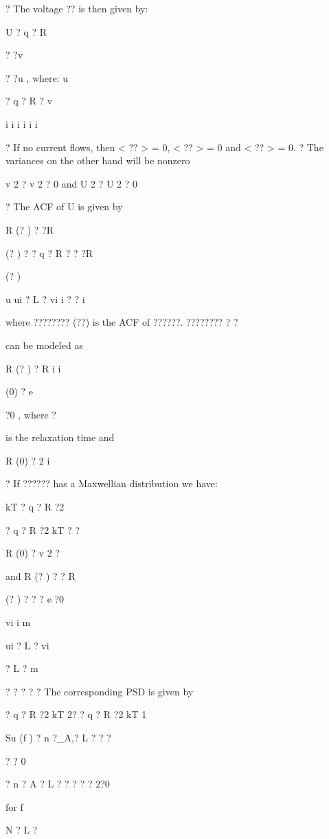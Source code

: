 \documentclass[2pt,landscape]{article}
\begin{document}
\begin{multicols*}{5}
?	The voltage ?? is then given by:


U ? q ? R


? ?v


? ?u ,	where: u


? q ? R ? v


i		i	i	i 
i	i

?	If no current flows, then < ?? > = 0, < ?? > = 0 and < ?? > = 0.
?	The variances on the other hand will be nonzero


v 2 ? v 2	? 0 and U 2 ? U 2	? 0



?	The ACF of U is given by


R (? ) ? ?R


(? ) ? ? q ? R ? ? ?R


(? )


u	ui	?	L	?	vi
i	?	?	i


where ???????? (??) is the ACF of ??????. ????????
? ?


can be modeled as


R (? ) ? R
i	i


(0)	? e


?0 ,	where ?


is the relaxation 
time and


R (0) ?	2
i


?	If ?????? has a Maxwellian distribution we have:


kT	? q ? R ?2


? q ? R ?2	kT	? ?


R (0) ? v 2	?


and R (? ) ?	? 
R




(? ) ?	?	? e ?0



vi	i	m


ui	?	L	?	vi


?	L	?	m


?	?	?	?
?	The corresponding PSD is given by

? q ? R ?2	kT	2?	? q ? R ?2	kT	1


Su (f ) ? n ?\_A,? L ? ?	?


?	?	0	





? n ? A ? L ? ?	? ?	? 2?0




for f \textbullet 




N	?	L	?



\end{multicols*}
\end{document}
